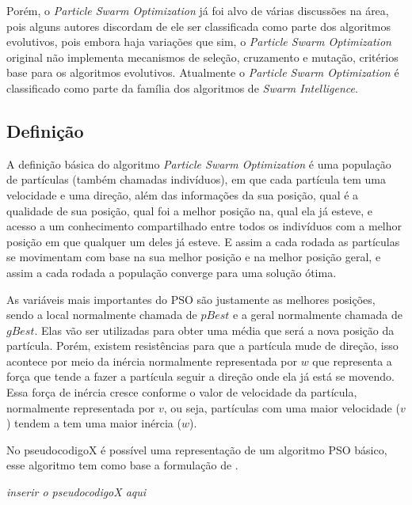         Porém, o \textit{Particle Swarm Optimization} já foi alvo de várias discussões na área, pois alguns autores discordam de ele ser classificada como parte dos algoritmos evolutivos, pois embora haja variações que sim, o \textit{Particle Swarm Optimization} original não implementa mecanismos de seleção, cruzamento e mutação, critérios base para os algoritmos evolutivos. \newline
        Atualmente o \textit{Particle Swarm Optimization} é classificado como parte da família dos algoritmos de \textit{Swarm Intelligence}.


    \subsection{Definição}
        A definição básica do algoritmo \textit{Particle Swarm Optimization} é uma população de partículas (também chamadas indivíduos), em que cada partícula tem uma velocidade e uma direção, além das informações da sua posição, qual é a qualidade de sua posição, qual foi a melhor posição na, qual ela já esteve, e acesso a um conhecimento compartilhado entre todos os indivíduos com a melhor posição em que qualquer um deles já esteve. E assim a cada rodada as partículas se movimentam com base na sua melhor posição e na melhor posição geral, e assim a cada rodada a população converge para uma solução ótima.\newline
        
        As variáveis mais importantes do PSO são justamente as melhores posições, sendo a local normalmente chamada de $pBest$ e a geral normalmente chamada de $gBest$. Elas vão ser utilizadas para obter uma média que será a nova posição da partícula. Porém, existem resistências para que a partícula mude de direção, isso acontece por meio da inércia normalmente representada por $w$ que representa a força que tende a fazer a partícula seguir a direção onde ela já está se movendo. Essa força de inércia cresce conforme o valor de velocidade da partícula, normalmente representada por $v$, ou seja, partículas com uma maior velocidade ($v$) tendem a tem uma maior inércia ($w$).\newline
        
        No pseudocodigoX é possível uma representação de um algoritmo PSO básico, esse algoritmo tem como base a formulação de \cite{martinez2009}.
        
        \textit{inserir o pseudocodigoX aqui}

